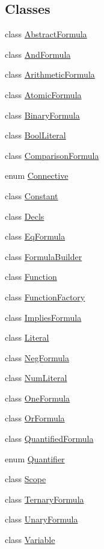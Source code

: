 \subsection*{Classes}
\begin{DoxyCompactItemize}
\item 
class \hyperlink{classuran_1_1formula_1_1_abstract_formula}{Abstract\+Formula}
\item 
class \hyperlink{classuran_1_1formula_1_1_and_formula}{And\+Formula}
\item 
class \hyperlink{classuran_1_1formula_1_1_arithmetic_formula}{Arithmetic\+Formula}
\item 
class \hyperlink{classuran_1_1formula_1_1_atomic_formula}{Atomic\+Formula}
\item 
class \hyperlink{classuran_1_1formula_1_1_binary_formula}{Binary\+Formula}
\item 
class \hyperlink{classuran_1_1formula_1_1_bool_literal}{Bool\+Literal}
\item 
class \hyperlink{classuran_1_1formula_1_1_comparison_formula}{Comparison\+Formula}
\item 
enum \hyperlink{enumuran_1_1formula_1_1_connective}{Connective}
\item 
class \hyperlink{classuran_1_1formula_1_1_constant}{Constant}
\item 
class \hyperlink{classuran_1_1formula_1_1_decls}{Decls}
\item 
class \hyperlink{classuran_1_1formula_1_1_eq_formula}{Eq\+Formula}
\item 
class \hyperlink{classuran_1_1formula_1_1_formula_builder}{Formula\+Builder}
\item 
class \hyperlink{classuran_1_1formula_1_1_function}{Function}
\item 
class \hyperlink{classuran_1_1formula_1_1_function_factory}{Function\+Factory}
\item 
class \hyperlink{classuran_1_1formula_1_1_implies_formula}{Implies\+Formula}
\item 
class \hyperlink{classuran_1_1formula_1_1_literal}{Literal}
\item 
class \hyperlink{classuran_1_1formula_1_1_neg_formula}{Neg\+Formula}
\item 
class \hyperlink{classuran_1_1formula_1_1_num_literal}{Num\+Literal}
\item 
class \hyperlink{classuran_1_1formula_1_1_one_formula}{One\+Formula}
\item 
class \hyperlink{classuran_1_1formula_1_1_or_formula}{Or\+Formula}
\item 
class \hyperlink{classuran_1_1formula_1_1_quantified_formula}{Quantified\+Formula}
\item 
enum \hyperlink{enumuran_1_1formula_1_1_quantifier}{Quantifier}
\item 
class \hyperlink{classuran_1_1formula_1_1_scope}{Scope}
\item 
class \hyperlink{classuran_1_1formula_1_1_ternary_formula}{Ternary\+Formula}
\item 
class \hyperlink{classuran_1_1formula_1_1_unary_formula}{Unary\+Formula}
\item 
class \hyperlink{classuran_1_1formula_1_1_variable}{Variable}
\end{DoxyCompactItemize}
